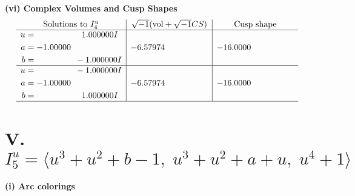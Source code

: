\documentclass[1p]{elsarticle_modified}
\theoremstyle{definition}
\newcommand{\I}{\sqrt{-1}}
\begin{document}
\newpage\flushleft \textbf{(vi) Complex Volumes and Cusp Shapes}
$$\begin{array}{c|c|c}  
\text{Solutions to }I^u_{4}& \I (\text{vol} + \sqrt{-1}CS) & \text{Cusp shape}\\
 \hline 
\begin{aligned}
u &= \phantom{-0.000000 -}1.000000 I \\
a &= -1.00000\phantom{ +0.000000I} \\
b &= \phantom{-0.000000 } -1.000000 I\end{aligned}
 & -6.57974\phantom{ +0.000000I} & -16.0000\phantom{ +0.000000I} \\ \hline\begin{aligned}
u &= \phantom{-0.000000 } -1.000000 I \\
a &= -1.00000\phantom{ +0.000000I} \\
b &= \phantom{-0.000000 -}1.000000 I\end{aligned}
 & -6.57974\phantom{ +0.000000I} & -16.0000\phantom{ +0.000000I}\\
 \hline 
 \end{array}$$\newpage\newpage\renewcommand{\arraystretch}{1}
\centering \section*{V. $I^u_{5}= \langle u^3+u^2+b-1,\;u^3+u^2+a+u,\;u^4+1 \rangle$}
\flushleft \textbf{(i) Arc colorings}\\
\end{document}
